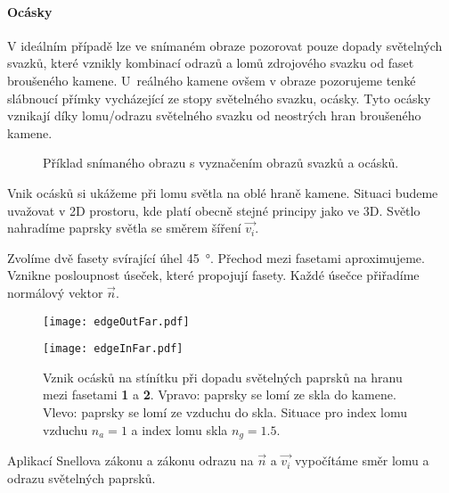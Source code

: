 \paragraph{Ocásky}
\hspace{1mm}

V ideálním případě lze ve snímaném obraze pozorovat pouze dopady světelných svazků, které vznikly kombinací odrazů a lomů zdrojového svazku od faset broušeného kamene. U~reálného kamene ovšem v obraze pozorujeme tenké slábnoucí přímky vycházející ze stopy světelného svazku, ocásky. Tyto ocásky vznikají díky lomu/odrazu světelného svazku od neostrých hran broušeného kamene.

\begin{figure}[h!]
\begin{center}
\scalebox{.9}{ }
\end{center}
\caption[Příklad snímaného obrazu s vyznačením obrazů svazků a ocásků.]{Příklad snímaného obrazu s vyznačením obrazů svazků a ocásků.}
\label{fig:tail_ex1}
\end{figure}


Vnik ocásků si ukážeme při lomu světla na oblé hraně kamene. Situaci budeme uvažovat v 2D prostoru, kde platí obecně stejné principy jako ve 3D. Světlo nahradíme paprsky světla se směrem šíření $\vec{v_i}$. 

Zvolíme dvě fasety svírající úhel \SI{45}{\degree}. Přechod mezi fasetami aproximujeme. Vznikne posloupnost úseček, které propojují fasety. Každé úsečce přiřadíme normálový vektor $\vec{n}$.  

\begin{figure}[h!]
\centering
\begin{minipage}[c]{0.43\textwidth}
\texttt{[image: edgeOutFar.pdf]}
\end{minipage}
\begin{minipage}[c]{0.53\textwidth}
\texttt{[image: edgeInFar.pdf]}
\end{minipage}

\caption[Vznik ocásků.]{Vznik ocásků na stínítku při dopadu světelných paprsků na hranu mezi fasetami \textbf{1} a \textbf{2}. Vpravo: paprsky se lomí ze skla do kamene. Vlevo: paprsky se lomí ze vzduchu do skla. Situace pro index lomu vzduchu $n_a = 1$ a index lomu skla $n_g = 1.5$.}
\label{fig:edgeIn}
\end{figure}
Aplikací Snellova zákonu a zákonu odrazu na $\vec{n}$ a $\vec{v_i}$ vypočítáme směr lomu a odrazu světelných paprsků.

